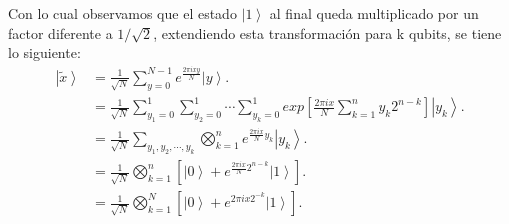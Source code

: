 Con lo cual observamos que el estado $\left| 1\right\rangle$ al final queda multiplicado por un factor diferente a $1/\sqrt{2}$, extendiendo esta transformación para
k qubits, se tiene lo siguiente:
\begin{align*}
    \left|\tilde{x} \right\rangle &= \frac{1}{\sqrt{N}} \sum\limits_{y=0}^{N-1} e^{\frac{2\pi i xy}{N} }\left|y \right\rangle.\\
    &=\frac{1}{\sqrt{N}}  \sum\limits_{y_1=0}^1\sum\limits_{y_2=0}^1 \cdots \sum\limits_{y_k=0}^1 exp\left[\frac{2\pi i x}{N} \sum\limits_{k=1}^n y_k 2^{n-k}\right] \left| y_k \right\rangle.\\
    &= \frac{1}{\sqrt{N}} \sum\limits_{y_1,y_2,\cdots, y_k} \bigotimes\limits_{k=1}^n e^{\frac{2\pi i x}{N}y_k} \left| y_k \right\rangle.\\
    &=\frac{1}{\sqrt{N}} \bigotimes\limits_{k=1}^n \left[\left|0 \right\rangle+e^{\frac{2\pi i x}{N} 2^{n-k}} \left| 1\right\rangle  \right].\\
    &=\frac{1}{\sqrt{N}} \bigotimes\limits_{k=1}^N \left[\left|0 \right\rangle+e^{2\pi i x 2^{-k}} \left| 1\right\rangle  \right].\\
\end{align*}
